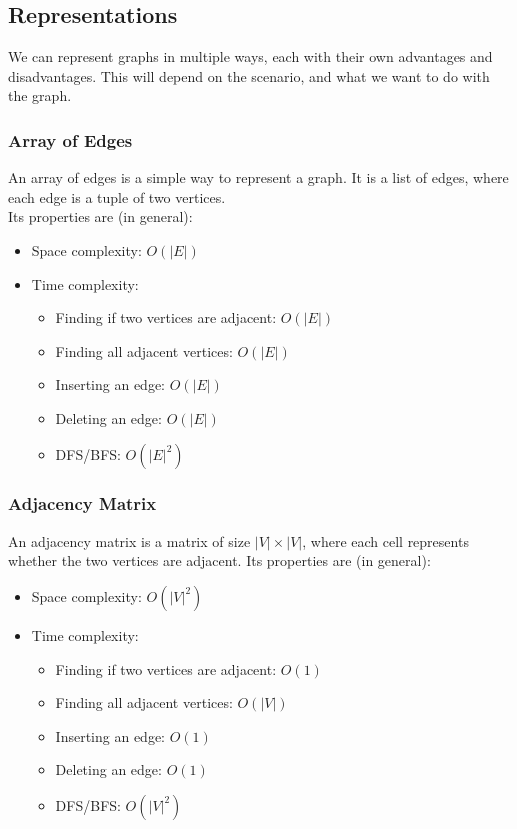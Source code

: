 \documentclass[14]{article}
\begin{document}
\subsection{Representations}
We can represent graphs in multiple ways, each with their own advantages and disadvantages. 
This will depend on the scenario, and what we want to do with the graph.
\subsubsection{Array of Edges}
An array of edges is a simple way to represent a graph. It is a list of edges, where each edge is a tuple of two vertices. \\ 
Its properties are (in general):
\begin{itemize}
    \item Space complexity: $O(|E|)$
    \item Time complexity: 
        \begin{itemize}
            \item Finding if two vertices are adjacent: $O(|E|)$
            \item Finding all adjacent vertices: $O(|E|)$
            \item Inserting an edge: $O(|E|)$
            \item Deleting an edge: $O(|E|)$
            \item DFS/BFS: $O(|E|^2)$
        \end{itemize}
\end{itemize}
\subsubsection{Adjacency Matrix}
An adjacency matrix is a matrix of size $|V| \times |V|$, where each cell represents whether the two vertices are adjacent.
Its properties are (in general):
\begin{itemize}
    \item Space complexity: $O(|V|^2)$
    \item Time complexity: 
        \begin{itemize}
            \item Finding if two vertices are adjacent: $O(1)$
            \item Finding all adjacent vertices: $O(|V|)$
            \item Inserting an edge: $O(1)$
            \item Deleting an edge: $O(1)$
            \item DFS/BFS: $O(|V|^2)$
        \end{itemize}
\end{itemize}
\end{document}
